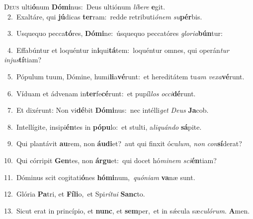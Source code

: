 \lettrine{\initial\textcolor{\initialcolor}{D}}{eus} ulti\-\textbf{ó}\-num \textbf{Dó}\-\textbf{mi}nus:~\star Deus ultiónum \textit{lí}\-\textit{be}\textit{re} \textbf{e}\-git.\\
{\numbfont\textcolor{\numbcolor}{~2.}}~Exaltáre, qui \textbf{jú}\-dicas \textbf{ter}\-ram:~\star redde retributi\-\textit{ó}\-\textit{nem} \textit{su}\-\textbf{pér}bis.\par
{\numbfont\textcolor{\numbcolor}{~3.}}~Usquequo pecca\-\textbf{tó}\-res, \textbf{Dó}\-\textbf{mi}ne:~\star úsquequo peccatóres \textit{glo}\-\textit{ri}\textit{a}\textbf{bún}tur:\par
{\numbfont\textcolor{\numbcolor}{~4.}}~Effabúntur et loquéntur in\-\textbf{i}\-qui\-\textbf{tá}\-tem:~\star loquéntur omnes, qui operán\textit{tur} \textit{in}\-\textit{jus}\textbf{tí}tiam?\par
{\numbfont\textcolor{\numbcolor}{~5.}}~Pópulum tuum, Dómine, humi\-\textbf{li}\-a\-\textbf{vé}\-runt:~\star et hereditátem tu\textit{am} \textit{ve}\-\textit{xa}\textbf{vé}runt.\par
{\numbfont\textcolor{\numbcolor}{~6.}}~Víduam et ádvenam in\-\textbf{ter}\-fe\-\textbf{cé}\-runt:~\star et pupíl\textit{los} \textit{oc}\-\textit{ci}\textbf{dé}runt.\par
{\numbfont\textcolor{\numbcolor}{~7.}}~Et dixérunt: Non vi\-\textbf{dé}\-bit \textbf{Dó}\-\textbf{mi}nus:~\star nec intélli\textit{get} \textit{De}\-\textit{us} \textbf{Ja}\-cob.\par
{\numbfont\textcolor{\numbcolor}{~8.}}~Intellígite, insipi\-\textbf{én}\-tes in \textbf{pó}\-\textbf{pu}lo:~\star et stulti, a\-\textit{li}\-\textit{quán}\textit{do} \textbf{sá}\-pite.\par
{\numbfont\textcolor{\numbcolor}{~9.}}~Qui plantávit \textbf{au}\-rem, non \textbf{áu}\-\textbf{di}et?~\star aut qui finxit ócu\-\textit{lum}\-, \textit{non} \textit{con}\-\textbf{sí}derat?\par
{\numbfont\textcolor{\numbcolor}{10.}}~Qui córripit \textbf{Gen}\-tes, non \textbf{ár}\-\textbf{gu}et:~\star qui docet hó\-\textit{mi}\-\textit{nem} \textit{sci}\-\textbf{én}tiam?\par
{\numbfont\textcolor{\numbcolor}{11.}}~Dóminus scit cogitati\-\textbf{ó}\-nes \textbf{hó}\-\textbf{mi}num,~\star \textit{quón}\-\textit{i}\textit{am} \textbf{va}\-næ sunt.\par
{\numbfont\textcolor{\numbcolor}{12.}}~Glória \textbf{Pa}\-tri, et \textbf{Fí}\-\textbf{li}o,~\star et Spi\-\textit{rí}\-\textit{tu}\textit{i} \textbf{Sanc}\-to.\par
{\numbfont\textcolor{\numbcolor}{13.}}~Sicut erat in princípio, et \textbf{nunc}\-, et \textbf{sem}\-per,~\star et in sǽcula sæ\-\textit{cu}\-\textit{ló}\textit{rum}. \textbf{A}\-men.\par
